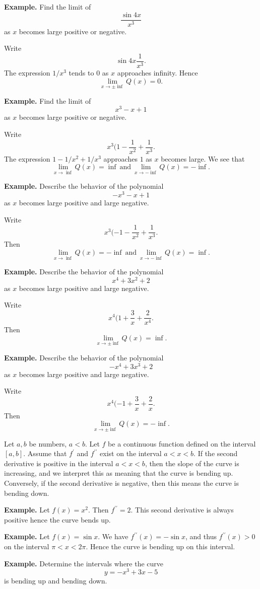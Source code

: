 \textbf{Example.} Find the limit of
\[\frac{\sin 4x}{x^3}\]
as $x$ becomes large positive or negative.

Write
\[\sin 4x \frac{1}{x^3}.\]
The expression $1/x^3$ tends to $0$ as $x$ approaches infinity. Hence
\[\lim_{x\to\pm\inf} Q(x) = 0.\]

\textbf{Example.} Find the limit of
\[x^3 - x + 1\]
as $x$ becomes large positive or negative.

Write
\[x^3(1 - \frac{1}{x^2} + \frac{1}{x^3}.\]
The expression $1 - 1/x^2 + 1/x^3$ approaches $1$ as $x$ becomes large. We see that
\[\lim_{x\to\inf} Q(x) = \inf\: \text{and}\: \lim_{x\to-\inf} Q(x) = -\inf.\]

\textbf{Example.} Describe the behavior of the polynomial
\[-x^3 - x + 1\]
as $x$ becomes large positive and large negative.

Write
\[x^3(-1 - \frac{1}{x^2} + \frac{1}{x^3}.\]
Then
\[\lim_{x\to\inf} Q(x) = -\inf\: \text{and}\: \lim_{x\to-\inf} Q(x) = \inf.\]

\textbf{Example.} Describe the behavior of the polynomial
\[x^4 + 3x^2 + 2\]
as $x$ becomes large positive and large negative.

Write
\[x^4(1 + \frac{3}{x} + \frac{2}{x^4}.\]
Then
\[\lim_{x\to\pm\inf} Q(x) = \inf.\]

\textbf{Example.} Describe the behavior of the polynomial
\[-x^4 + 3x^3 + 2\]
as $x$ becomes large positive and large negative.

Write
\[x^4(-1 + \frac{3}{x} + \frac{2}{x}.\]
Then
\[\lim_{x\to\pm\inf} Q(x) = -\inf.\]

Let $a, b$ be numbers, $a < b$. Let $f$ be a continuous function defined on the interval $[a, b]$. Assume that $f^\prime$ and $f^{\prime\prime}$ exist on the interval $a < x < b$. If the second derivative is positive in the interval $a < x < b$, then the slope of the curve is increasing, and we interpret this as meaning that the curve is bending up. Conversely, if the second derivative is 
negative, then this means the curve is bending down.

\textbf{Example.} Let $f(x) = x^2$. Then $f^{\prime\prime} = 2$. This second derivative is always positive hence the curve bends up.

\textbf{Example.} Let $f(x) = \sin x$. We have $f^{\prime\prime}(x) = -\sin x$, and thus $f^{\prime\prime}(x) > 0$ on the interval $\pi < x < 2\pi$. Hence the curve is bending up on this interval.

\textbf{Example.} Determine the intervals where the curve
\[y = -x^3 + 3x - 5\]
is bending up and bending down.

